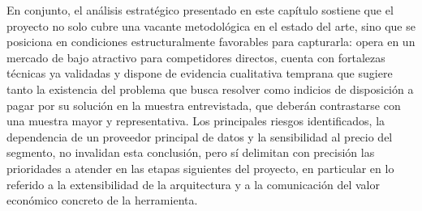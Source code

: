 En conjunto, el análisis estratégico presentado en este capítulo sostiene que el proyecto no solo cubre una vacante metodológica en el estado del arte, sino que se posiciona en condiciones estructuralmente favorables para capturarla: opera en un mercado de bajo atractivo para competidores directos, cuenta con fortalezas técnicas ya validadas y dispone de evidencia cualitativa temprana que sugiere tanto la existencia del problema que busca resolver como indicios de disposición a pagar por su solución en la muestra entrevistada, que deberán contrastarse con una muestra mayor y representativa. Los principales riesgos identificados, la dependencia de un proveedor principal de datos y la sensibilidad al precio del segmento, no invalidan esta conclusión, pero sí delimitan con precisión las prioridades a atender en las etapas siguientes del proyecto, en particular en lo referido a la extensibilidad de la arquitectura y a la comunicación del valor económico concreto de la herramienta.
